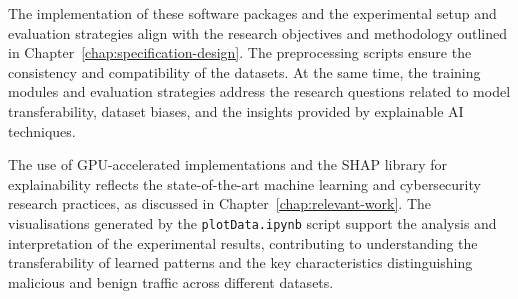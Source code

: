 The implementation of these software packages and the experimental setup and evaluation strategies align with the research objectives and methodology outlined in Chapter~\ref{chap:specification-design}. The preprocessing scripts ensure the consistency and compatibility of the datasets. At the same time, the training modules and evaluation strategies address the research questions related to model transferability, dataset biases, and the insights provided by explainable AI techniques.

The use of GPU-accelerated implementations and the SHAP library for explainability reflects the state-of-the-art machine learning and cybersecurity research practices, as discussed in Chapter~\ref{chap:relevant-work}. The visualisations generated by the \texttt{plotData.ipynb} script support the analysis and interpretation of the experimental results, contributing to understanding the transferability of learned patterns and the key characteristics distinguishing malicious and benign traffic across different datasets.